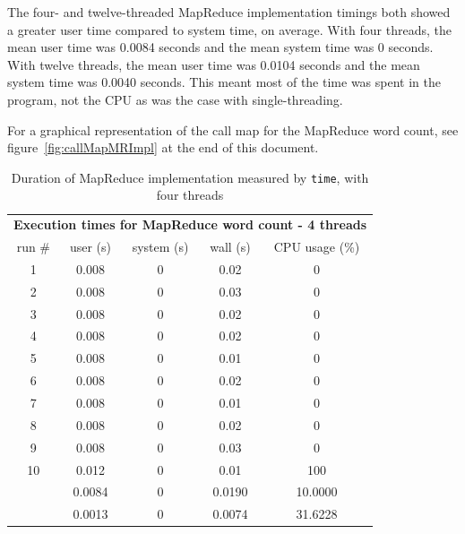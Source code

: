 \documentclass[12pt, letterpaper]{article}
\begin{document}
	The four- and twelve-threaded MapReduce implementation timings both showed a greater user time compared to system time, on average. With four threads, the mean user time was 0.0084 seconds and the mean system time was 0 seconds. With twelve threads, the mean user time was 0.0104 seconds and the mean system time was 0.0040 seconds. This meant most of the time was spent in the program, not the CPU as was the case with single-threading.

	For a graphical representation of the call map for the MapReduce word count, see figure~\ref{fig:callMapMRImpl} at the end of this document.
\newpage
	\begin{table}[h]
	\centering
	\begin{tabular}{ccccc}
	\multicolumn{5}{c}{\cellcolor[HTML]{FFFFC7}\textbf{Execution times for MapReduce word count - 4 threads}} \\
	\cellcolor[HTML]{EFEFEF}run \# & \cellcolor[HTML]{EFEFEF}user (s) & \cellcolor[HTML]{EFEFEF}system (s) & 				\cellcolor[HTML]{EFEFEF}wall (s) & \cellcolor[HTML]{EFEFEF}CPU usage (\%) \\
	1 & 0.008 & 0 & 0.02 & 0 \\
	2 & 0.008 & 0 & 0.03 & 0 \\
	3 & 0.008 & 0 & 0.02 & 0 \\
	4 & 0.008 & 0 & 0.02 & 0 \\
	5 & 0.008 & 0 & 0.01 & 0 \\
	6 & 0.008 & 0 & 0.02 & 0 \\
	7 & 0.008 & 0 & 0.01 & 0 \\
	8 & 0.008 & 0 & 0.02 & 0 \\
	9 & 0.008 & 0 & 0.03 & 0 \\
	10 & 0.012 & 0 & 0.01 & 100 \\
	\rowcolor[HTML]{D0F0D0} 
	\multicolumn{1}{r}{\cellcolor[HTML]{9AFF99}mean (s)} & 0.0084 & 0 & 0.0190 & 10.0000 \\
	\rowcolor[HTML]{ECF4FF} 
	\multicolumn{1}{r}{\cellcolor[HTML]{DAE8FC}std. dev. (s)} & 0.0013 & 0 & 0.0074 & 31.6228
	\end{tabular}
	\caption{Duration of MapReduce implementation measured by \texttt{time}, with four threads\label{table:MR4ImplWC}}
	\end{table}
\end{document}
